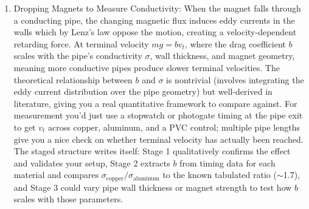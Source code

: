 \documentclass[11pt]{article}
\begin{document}
\begin{enumerate}
\begin{enumerate}
              \item Dropping Magnets to Measure Conductivity: When the magnet falls through a conducting pipe, the changing magnetic flux induces eddy currents in the walls which by Lenz's law oppose the motion, creating a velocity-dependent retarding force. At terminal velocity $mg = bv_t$, where the drag coefficient $b$ scales with the pipe's conductivity $\sigma$, wall thickness, and magnet geometry, meaning more conductive pipes produce slower terminal velocities. The theoretical relationship between $b$ and $\sigma$ is nontrivial (involves integrating the eddy current distribution over the pipe geometry) but well-derived in literature, giving you a real quantitative framework to compare against. For measurement you'd just use a stopwatch or photogate timing at the pipe exit to get $v_t$ across copper, aluminum, and a PVC control; multiple pipe lengths give you a nice check on whether terminal velocity has actually been reached. The staged structure writes itself: Stage 1 qualitatively confirms the effect and validates your setup, Stage 2 extracts $b$ from timing data for each material and compares $\sigma_{\text{copper}}/\sigma_{\text{aluminum}}$ to the known tabulated ratio ($\sim$1.7), and Stage 3 could vary pipe wall thickness or magnet strength to test how $b$ scales with those parameters.
          \end{enumerate}
\end{enumerate}
\end{document}
